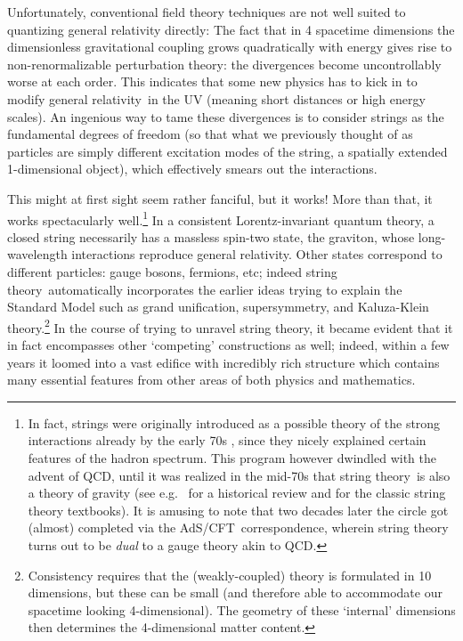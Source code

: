 \documentclass[12pt,a4paper]{article}
\def\AC{AdS/CFT}
\def\GR{general relativity}
\def\STY{string theory}
\begin{document}
Unfortunately, conventional field theory techniques are not well suited to quantizing general relativity directly:
 The fact that in 4 spacetime dimensions the dimensionless gravitational coupling  grows quadratically with energy gives rise to non-renormalizable perturbation theory: the divergences become uncontrollably worse at each order.  This indicates that some new physics has to kick in
to modify \GR\
  in the UV (meaning short distances or high energy scales).
An ingenious way to tame these divergences is to consider strings as the fundamental degrees of freedom (so that what we previously thought of as particles are simply different excitation modes of the string, a spatially extended 1-dimensional object), which effectively smears out the interactions.

This might at first sight seem rather fanciful, but it works!  More than that, it works spectacularly well.\footnote{
In fact, strings were originally introduced as a possible theory of the strong interactions already by the early 70s , since they nicely explained certain features of the hadron spectrum.  This program however dwindled with the advent of QCD,  until it was realized in the mid-70s that \STY\ is also a theory of gravity  \cite{scherk1974dual} (see e.g.\ \cite{Schwarz:2012zc} for a historical review and  \cite{Green:1987sp,Polchinski:1998rq} for the classic string theory textbooks).  It is amusing to note that two decades later the circle got  (almost) completed  via the \AC\ correspondence, wherein string theory turns out to be {\it dual} to a gauge theory akin to QCD.
}  
In a consistent Lorentz-invariant quantum theory, a closed string necessarily has a massless spin-two state, the graviton, whose long-wavelength interactions reproduce \GR.  Other states correspond to different particles: gauge bosons, fermions, etc; indeed \STY\ automatically incorporates the earlier ideas trying to explain the Standard Model such as grand unification, supersymmetry, and Kaluza-Klein theory.\footnote{
Consistency requires that the (weakly-coupled) theory is formulated in 10 dimensions, but these can be small (and therefore able to accommodate our spacetime looking 4-dimensional). The geometry of these `internal' dimensions then determines the 4-dimensional matter content.
}
In the course of trying to unravel \STY, it became evident that it in fact encompasses other `competing' constructions as well; indeed, within a few years it loomed into a vast edifice with incredibly rich structure which contains many essential features from other areas of both physics and mathematics.
\end{document}
